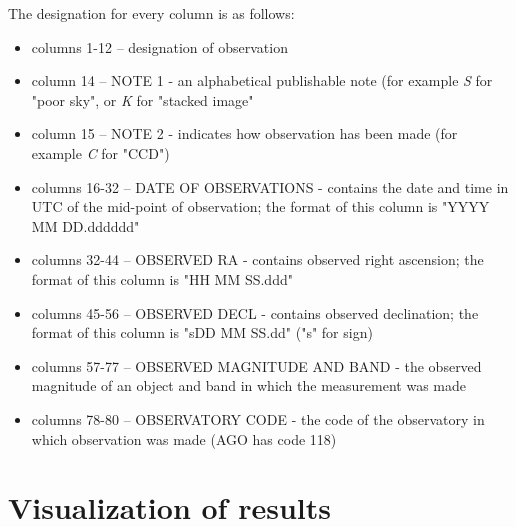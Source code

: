 	The designation for every column is as follows:
	
	\begin{itemize}
		\item columns 1-12 -- designation of observation
		\item column 14 -- NOTE 1 - an alphabetical publishable note (for example \emph{S} for "poor sky", or \emph{K} for "stacked image"
		\item column 15 -- NOTE 2 - indicates how observation has been made (for example \emph{C} for "CCD")
		\item columns 16-32 -- DATE OF OBSERVATIONS - contains the date and time in UTC of the mid-point of observation; the format of this column is "YYYY MM DD.dddddd"
		\item columns 32-44 -- OBSERVED RA - contains observed right ascension; the format of this column is "HH MM SS.ddd"
		\item columns 45-56 -- OBSERVED DECL - contains observed declination; the format of this column is "sDD MM SS.dd" ("s" for sign)
		\item columns 57-77 -- OBSERVED MAGNITUDE AND BAND - the observed magnitude of an object and band in which the measurement was made
		\item columns 78-80 -- OBSERVATORY CODE - the code of the observatory in which observation was made (AGO has code 118)
	\end{itemize}

	\citep{mpc}

\section{Visualization of results}\label{sec:visualization}
